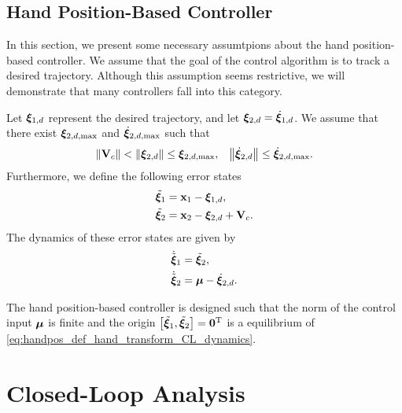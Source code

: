 \subsection{Hand Position-Based Controller}
In this section, we present some necessary assumtpions about the hand position-based controller.
We assume that the goal of the control algorithm is to track a desired trajectory.
Although this assumption seems restrictive, we will demonstrate that many controllers fall into this category.

Let $\bm{\xi}_{1, d}$ represent the desired trajectory, and let $\bm{\xi}_{2, d} = \dot{\bm{\xi}}_{1, d}$.
We assume that there exist $\bm{\xi}_{2, d, \max}$ and $\dot{\bm{\xi}}_{2, d, \max}$ such that
\begin{align}
    \left\|\mathbf{V}_c\right\| &< \left\|\bm{\xi}_{2, d}\right\| \leq \bm{\xi}_{2, d, \max}, &
    \left\|\dot{\bm{\xi}}_{2, d}\right\| \leq \dot{\bm{\xi}}_{2, d, \max}.
\end{align}
Furthermore, we define the following error states
\begin{subequations}
    \begin{align}
        \tilde{\bm{\xi}}_1 &= \mathbf{x}_1 - \bm{\xi}_{1, d}, \\
        \tilde{\bm{\xi}}_2 &= \mathbf{x}_2 - \bm{\xi}_{2, d} + \mathbf{V}_c.
    \end{align} \label{eq:handpos_def_hand_transform_CL}
\end{subequations}
The dynamics of these error states are given by
\begin{subequations}
    \begin{align}
        \dot{\tilde{\bm{\xi}}}_1 &= \tilde{\bm{\xi}}_2, \\
        \dot{\tilde{\bm{\xi}}}_2 &= \bm{\mu} - \dot{\bm{\xi}}_{2,d}.
    \end{align} \label{eq:handpos_def_hand_transform_CL_dynamics}
\end{subequations}

\begin{asm}
    The hand position-based controller is designed such that the norm of the control input $\bm{\mu}$ is finite and the origin $\left[\tilde{\bm{\xi}}_1, \tilde{\bm{\xi}}_2\right] = \mathbf{0}^{\mathrm{T}}$ is a  equilibrium of \eqref{eq:handpos_def_hand_transform_CL_dynamics}.
\end{asm}

\section{Closed-Loop Analysis}
\label{sec:handpos_def_closed_loop_analysis}

